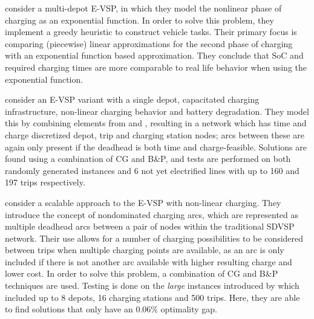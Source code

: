 \documentclass[]{article}
\begin{document}

\citet{Olsen2020} consider a multi-depot E-VSP, in which they model the nonlinear phase of charging as an exponential function. In order to solve this problem, they implement a greedy heuristic to construct vehicle tasks. Their primary focus is comparing (piecewise) linear approximations for the second phase of charging with an exponential function based approximation. They conclude that SoC and required charging times are more comparable to real life behavior when using the exponential function.

\citet{Zhang2021} consider an E-VSP variant with a single depot, capacitated charging infrastructure, non-linear charging behavior and battery degradation. They model this by combining elements from \citet{Li2014} and \citet{vanKootenNiekerk2017}, resulting in a network which has time and charge discretized depot, trip and charging station nodes; arcs between these are again only present if the deadhead is both time and charge-feasible. Solutions are found using a combination of CG and B\&P, and tests are performed on both randomly generated instances and 6 not yet electrified lines with up to 160 and 197 trips respectively.

\citet{Parmentier2023} consider a scalable approach to the E-VSP with non-linear charging. They introduce the concept of nondominated charging arcs, which are represented as multiple deadhead arcs between a pair of nodes within the traditional SDVSP network. Their use allows for a number of charging possibilities to be considered between trips when multiple charging points are available, as an arc is only included if there is not another arc available with higher resulting charge and lower cost. In order to solve this problem, a combination of CG and B\&P techniques are used. Testing is done on the \textit{large} instances introduced by \citet{Wen2016} which included up to 8 depots, 16 charging stations and 500 trips. Here, they are able to find solutions that only have an 0.06\% optimality gap.
\end{document}
